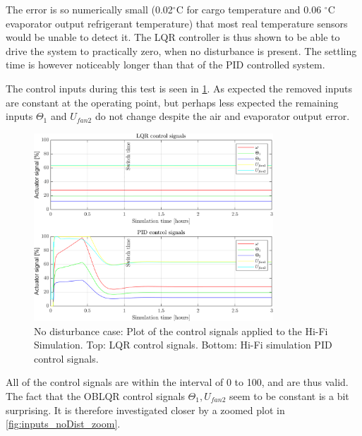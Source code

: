 \noindent The error is so numerically small (0.02$^{\circ}$C for cargo temperature and 0.06 $^{\circ}$C evaporator output refrigerant temperature) that most real temperature sensors would be unable to detect it. The LQR controller is thus shown to be able to drive the system to practically zero, when no disturbance is present. The settling time is however noticeably longer than that of the PID controlled system. 

The control inputs during this test is seen in \cref{fig:inputs_noDist}. As expected the removed inputs are constant at the operating point, but perhaps less expected the remaining inputs $\Theta_1$ and $U_{fan2}$ do not change despite the air and evaporator output error.

\begin{figure}[H]
	\centering
	\includegraphics[width=0.8\textwidth]{Graphics/fig_inputs_noDist.png}
	\caption{No disturbance case: Plot of the control signals applied to the Hi-Fi Simulation. Top: LQR control signals. Bottom: Hi-Fi simulation PID control signals.}
	\label{fig:inputs_noDist}
\end{figure}
All of the control signals are within the interval of 0 to 100, and are thus valid. The fact that the OBLQR control signals $ \Theta_1, U_{fan2} $ seem to be constant is a bit surprising. It is therefore investigated closer by a zoomed plot in \cref{fig:inputs_noDist_zoom}.

